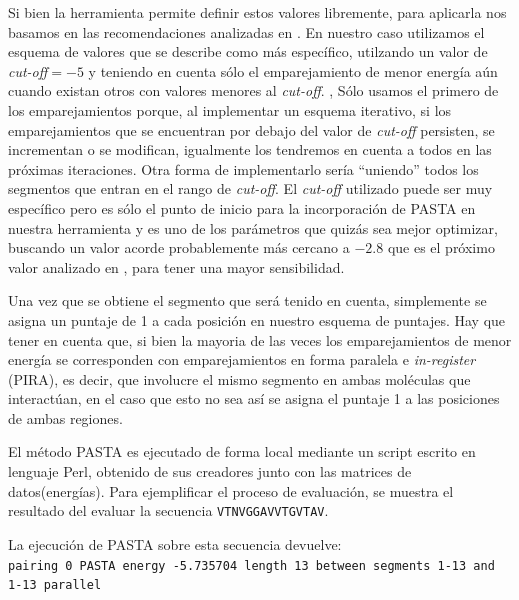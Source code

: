 Si bien la herramienta permite definir estos valores libremente, para aplicarla nos basamos en las recomendaciones analizadas en \cite{walsh2014pasta}.
En nuestro caso utilizamos el esquema de valores que se describe como más específico, utilzando un valor de \textit{cut-off}$=-5$ y teniendo en cuenta sólo el emparejamiento de menor energía aún cuando existan otros con valores menores al \textit{cut-off}. , 
Sólo usamos el primero de los emparejamientos porque, al implementar un esquema iterativo, si los emparejamientos que se encuentran por debajo  del valor de \textit{cut-off} persisten, se incrementan o se modifican,
igualmente los tendremos en cuenta a todos en las próximas iteraciones. Otra forma de implementarlo sería ``uniendo'' todos los segmentos que entran en el rango de \textit{cut-off}.
El \textit{cut-off} utilizado puede ser muy específico pero es sólo el punto de inicio para la incorporación de PASTA en nuestra herramienta y es uno de los parámetros que quizás sea mejor optimizar, 
buscando un valor acorde probablemente más cercano a $-2.8$ que es el próximo valor analizado en \cite{walsh2014pasta}, para tener una mayor sensibilidad. 

Una vez que se obtiene el segmento que será tenido en cuenta, simplemente se asigna un puntaje de 1 a cada posición en nuestro esquema de puntajes.
Hay que tener en cuenta que, si bien la mayoria de las veces los emparejamientos de menor energía se corresponden con emparejamientos en forma paralela e \textit{in-register} (PIRA), es decir, 
que involucre el mismo segmento en ambas moléculas que interactúan, en el caso que esto no sea así se asigna el puntaje 1 a las posiciones de ambas regiones. 

El método PASTA es ejecutado de forma local mediante un script escrito en lenguaje Perl, obtenido de sus creadores junto con las matrices de datos(energías).
Para ejemplificar el proceso de evaluación, se muestra el resultado del evaluar la secuencia \texttt{VTNVGGAVVTGVTAV}.

La ejecución de PASTA sobre esta secuencia devuelve: \\
\noindent
\texttt{pairing 0  PASTA energy -5.735704  length 13  between segments 1-13 and 1-13  parallel}

